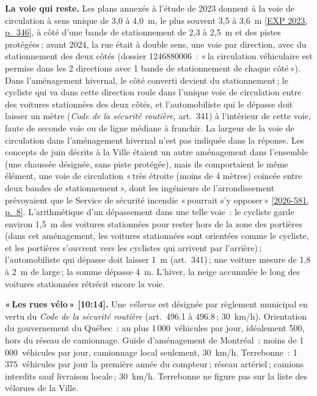 \documentclass[11pt,letterpaper]{article}
\newcommand{\repourl}{https://github.com/OpenMobilityData/Terrebonne-open-sources}
\newcommand{\pagesurl}{https://openmobilitydata.github.io/Terrebonne-access-requests}
\newcommand{\cliptime}[1]{\textsf{\small[#1]}}
\newcommand{\pgl}[2]{\href{\pagesurl/2026-581/raw/01_emails_mandate_counts.pdf\#page=#1}{\textsf{\small[2026-581, p.~#2]}}}
\newcommand{\pg}[1]{\pgl{#1}{#1}}
\newcommand{\exppg}[1]{\href{\repourl/blob/main/2023-exp-mobility-study/raw/EXP_Etude_de_mobilite_rue_de_Terrebonne_2023.pdf}{\textsf{\small[EXP 2023, p.~#1]}}}
\begin{document}
\textbf{La voie qui reste.} Les plans annexés à l'étude de 2023 donnent à
la voie de circulation à sens unique de 3{,}0 à 4{,}0~m, le plus souvent
3{,}5 à 3{,}6~m \exppg{346}, à côté d'une bande de stationnement de 2{,}3 à
2{,}5~m et des pistes protégées\,; avant 2024, la rue était à double sens,
une voie par direction, avec du stationnement des deux côtés (dossier
1246880006~: «\,la circulation véhiculaire est permise dans les 2 directions
avec 1 bande de stationnement de chaque côté\,»). Dans l'aménagement
hivernal, le côté converti devient du stationnement\,; le cycliste qui va
dans cette direction roule dans l'unique voie de circulation entre des
voitures stationnées des deux côtés, et l'automobiliste qui le dépasse doit
laisser un mètre (\emph{Code de la sécurité routière}, art.~341) à
l'intérieur de cette voie, faute de seconde voie ou de ligne médiane à
franchir. La largeur de la voie de circulation dans l'aménagement hivernal
n'est pas indiquée dans la réponse. Les concepts de juin décrits à la Ville
étaient un autre aménagement dans l'ensemble (une chaussée désignée, sans
piste protégée), mais ils comportaient le même élément, une voie de
circulation «\,très étroite (moins de 4 mètres) coincée entre deux bandes de
stationnement\,», dont les ingénieurs de l'arrondissement prévoyaient que
le Service de sécurité incendie «\,pourrait s'y opposer\,» \pg{8}.
L'arithmétique d'un dépassement dans une telle voie~: le cycliste garde
environ 1{,}5~m des voitures stationnées pour rester hors de la zone des
portières (dans cet aménagement, les voitures stationnées sont orientées
comme le cycliste, et les portières s'ouvrent vers les cyclistes qui
arrivent par l'arrière)\,; l'automobiliste qui dépasse doit laisser 1~m
(art.~341)\,; une voiture mesure de 1{,}8 à 2~m de large\,; la somme dépasse
4~m. L'hiver, la neige accumulée le long des voitures stationnées rétrécit
encore la voie.

\textbf{«\,Les rues vélo\,» \cliptime{10:14}.} Une \emph{vélorue} est
désignée par règlement municipal en vertu du \emph{Code de la sécurité
routière} (art.~496.1 à 496.8\,; 30~km/h). Orientation du gouvernement du
Québec~: au plus 1\,000~véhicules par jour, idéalement 500, hors du réseau
de camionnage. Guide d'aménagement de Montréal~: moins de 1\,000~véhicules
par jour, camionnage local seulement, 30~km/h. Terrebonne~: 1\,375~véhicules
par jour la première année du compteur\,; réseau artériel\,; camions
interdits sauf livraison locale\,; 30~km/h. Terrebonne ne figure pas sur la
liste des vélorues de la Ville.
\end{document}
